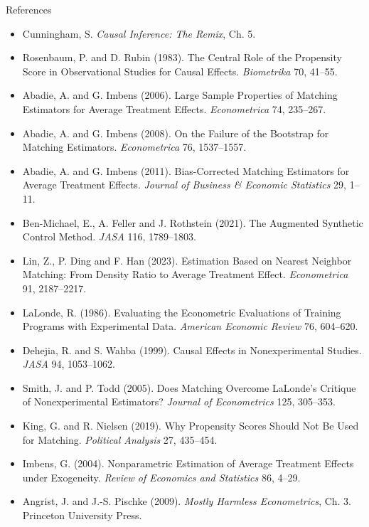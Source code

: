 \documentclass[
  11pt,
  ignorenonframetext,
  aspectratio=169,
]{beamer}
\providecommand{\tightlist}{%
  \setlength{\itemsep}{0pt}\setlength{\parskip}{0pt}}
\begin{document}
\begin{frame}{References}
\protect{}\label{references}
\scriptsize

\begin{itemize}
\tightlist
\item
  Cunningham, S. \emph{Causal Inference: The Remix}, Ch. 5.
\item
  Rosenbaum, P. and D. Rubin (1983). The Central Role of the Propensity
  Score in Observational Studies for Causal Effects. \emph{Biometrika}
  70, 41--55.
\item
  Abadie, A. and G. Imbens (2006). Large Sample Properties of Matching
  Estimators for Average Treatment Effects. \emph{Econometrica} 74,
  235--267.
\item
  Abadie, A. and G. Imbens (2008). On the Failure of the Bootstrap for
  Matching Estimators. \emph{Econometrica} 76, 1537--1557.
\item
  Abadie, A. and G. Imbens (2011). Bias-Corrected Matching Estimators
  for Average Treatment Effects. \emph{Journal of Business \& Economic
  Statistics} 29, 1--11.
\item
  Ben-Michael, E., A. Feller and J. Rothstein (2021). The Augmented
  Synthetic Control Method. \emph{JASA} 116, 1789--1803.
\item
  Lin, Z., P. Ding and F. Han (2023). Estimation Based on Nearest
  Neighbor Matching: From Density Ratio to Average Treatment Effect.
  \emph{Econometrica} 91, 2187--2217.
\item
  LaLonde, R. (1986). Evaluating the Econometric Evaluations of Training
  Programs with Experimental Data. \emph{American Economic Review} 76,
  604--620.
\item
  Dehejia, R. and S. Wahba (1999). Causal Effects in Nonexperimental
  Studies. \emph{JASA} 94, 1053--1062.
\item
  Smith, J. and P. Todd (2005). Does Matching Overcome LaLonde's
  Critique of Nonexperimental Estimators? \emph{Journal of Econometrics}
  125, 305--353.
\item
  King, G. and R. Nielsen (2019). Why Propensity Scores Should Not Be
  Used for Matching. \emph{Political Analysis} 27, 435--454.
\item
  Imbens, G. (2004). Nonparametric Estimation of Average Treatment
  Effects under Exogeneity. \emph{Review of Economics and Statistics}
  86, 4--29.
\item
  Angrist, J. and J.-S. Pischke (2009). \emph{Mostly Harmless
  Econometrics}, Ch. 3. Princeton University Press.
\end{itemize}
\end{frame}
\end{document}
